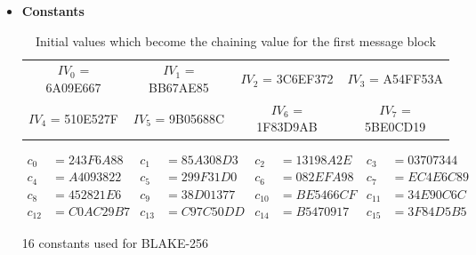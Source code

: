 \documentclass[12pt]{artikel3}                  %
\begin{document}
\begin{itemize}
\item {\bf Constants}
  \begin{table}[h]
    \begin{center}
      \begin{tabular}{ *{4}{c}}
        $IV_{0}$ = 6A09E667 & $IV_{1}$ = BB67AE85 & $IV_{2}$ = 3C6EF372 & $IV_{3}$ = A54FF53A \\
        $IV_{4}$ = 510E527F & $IV_{5}$ = 9B05688C & $IV_{6}$ = 1F83D9AB & $IV_{7}$ = 5BE0CD19 \\
      \end{tabular}
      \caption{Initial values which become the chaining value for the first message block}
    \end{center}
  \end{table}
  
  \begin{table}[h]
    \begin{align*}
         c_{0}  &= 243F6A88 & c_{1}  &= 85A308D3 & c_{2}  &= 13198A2E & c_{3}  &= 03707344 
      \\ c_{4}  &= A4093822 & c_{5}  &= 299F31D0 & c_{6}  &= 082EFA98 & c_{7}  &= EC4E6C89 
      \\ c_{8}  &= 452821E6 & c_{9}  &= 38D01377 & c_{10} &= BE5466CF & c_{11} &= 34E90C6C 
      \\ c_{12} &= C0AC29B7 & c_{13} &= C97C50DD & c_{14} &= B5470917 & c_{15} &= 3F84D5B5 
    \end{align*}
    \caption{16 constants used for BLAKE-256}
  \end{table}


\end{itemize}
\end{document}
